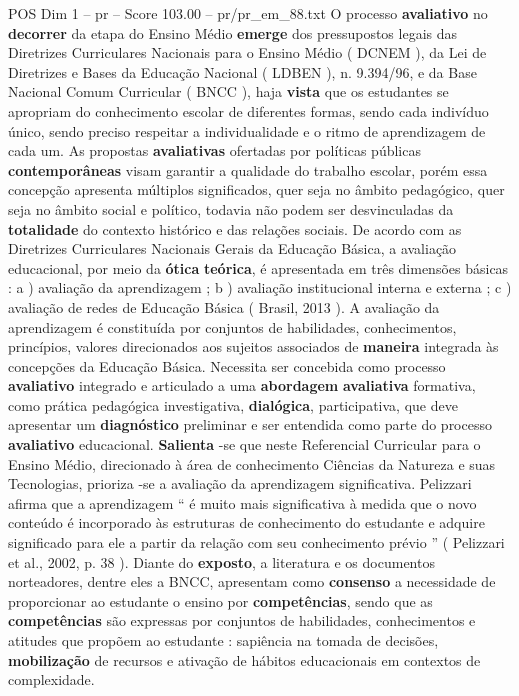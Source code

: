 \begin{textsample}{POS Dim 1 – pr – Score 103.00 – pr/pr\_em\_88.txt}
O processo \textbf{avaliativo} no \textbf{decorrer} da etapa do Ensino Médio \textbf{emerge} dos pressupostos legais das Diretrizes Curriculares Nacionais para o Ensino Médio ( DCNEM ), da Lei de Diretrizes e Bases da Educação Nacional ( LDBEN ), n. 9.394/96, e da Base Nacional Comum Curricular ( BNCC ), haja \textbf{vista} que os estudantes se apropriam do conhecimento escolar de diferentes formas, sendo cada indivíduo único, sendo preciso respeitar a individualidade e o ritmo de aprendizagem de cada um.
As propostas \textbf{avaliativas} ofertadas por políticas públicas \textbf{contemporâneas} visam garantir a qualidade do trabalho escolar, porém essa concepção apresenta múltiplos significados, quer seja no âmbito pedagógico, quer seja no âmbito social e político, todavia não podem ser desvinculadas da \textbf{totalidade} do contexto histórico e das relações sociais.
De acordo com as Diretrizes Curriculares Nacionais Gerais da Educação Básica, a avaliação educacional, por meio da \textbf{ótica} \textbf{teórica}, é apresentada em três dimensões básicas : a ) avaliação da aprendizagem ; b ) avaliação institucional interna e externa ; c ) avaliação de redes de Educação Básica ( Brasil, 2013 ).
A avaliação da aprendizagem é constituída por conjuntos de habilidades, conhecimentos, princípios, valores direcionados aos sujeitos associados de \textbf{maneira} integrada às concepções da Educação Básica.
Necessita ser concebida como processo \textbf{avaliativo} integrado e articulado a uma \textbf{abordagem} \textbf{avaliativa} formativa, como prática pedagógica investigativa, \textbf{dialógica}, participativa, que deve apresentar um \textbf{diagnóstico} preliminar e ser entendida como parte do processo \textbf{avaliativo} educacional. \textbf{Salienta} -se que neste Referencial Curricular para o Ensino Médio, direcionado à área de conhecimento Ciências da Natureza e suas Tecnologias, prioriza -se a avaliação da aprendizagem significativa.
Pelizzari afirma que a aprendizagem “ é muito mais significativa à medida que o novo conteúdo é incorporado às estruturas de conhecimento do estudante e adquire significado para ele a partir da relação com seu conhecimento prévio ” ( Pelizzari et al., 2002, p. 38 ).
Diante do \textbf{exposto}, a literatura e os documentos norteadores, dentre eles a BNCC, apresentam como \textbf{consenso} a necessidade de proporcionar ao estudante o ensino por \textbf{competências}, sendo que as \textbf{competências} são expressas por conjuntos de habilidades, conhecimentos e atitudes que propõem ao estudante : sapiência na tomada de decisões, \textbf{mobilização} de recursos e ativação de hábitos educacionais em contextos de complexidade.

\end{textsample}
